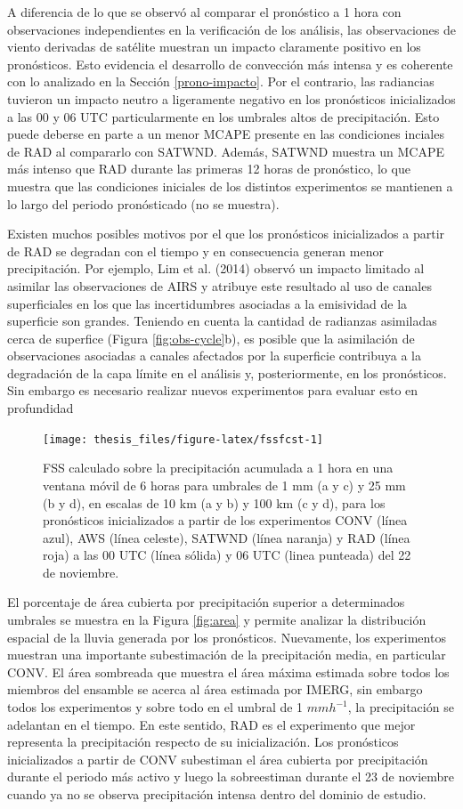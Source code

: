 \documentclass[12pt,oneside,a4paper]{reedthesis}
\begin{document}
A diferencia de lo que se observó al comparar el pronóstico a 1 hora con observaciones independientes en la verificación de los análisis, las observaciones de viento derivadas de satélite muestran un impacto claramente positivo en los pronósticos. Esto evidencia el desarrollo de convección más intensa y es coherente con lo analizado en la Sección \ref{prono-impacto}. Por el contrario, las radiancias tuvieron un impacto neutro a ligeramente negativo en los pronósticos inicializados a las 00 y 06 UTC particularmente en los umbrales altos de precipitación. Esto puede deberse en parte a un menor MCAPE presente en las condiciones inciales de RAD al compararlo con SATWND. Además, SATWND muestra un MCAPE más intenso que RAD durante las primeras 12 horas de pronóstico, lo que muestra que las condiciones iniciales de los distintos experimentos se mantienen a lo largo del periodo pronósticado (no se muestra).

Existen muchos posibles motivos por el que los pronósticos inicializados a partir de RAD se degradan con el tiempo y en consecuencia generan menor precipitación. Por ejemplo, Lim et al. (2014) observó un impacto limitado al asimilar las observaciones de AIRS y atribuye este resultado al uso de canales superficiales en los que las incertidumbres asociadas a la emisividad de la superficie son grandes. Teniendo en cuenta la cantidad de radianzas asimiladas cerca de superfice (Figura \ref{fig:obs-cycle}b), es posible que la asimilación de observaciones asociadas a canales afectados por la superficie contribuya a la degradación de la capa límite en el análisis y, posteriormente, en los pronósticos. Sin embargo es necesario realizar nuevos experimentos para evaluar esto en profundidad


\begin{figure}
\texttt{[image: thesis\_files/figure-latex/fssfcst-1]} \caption{FSS calculado sobre la precipitación acumulada a 1 hora en una ventana móvil de 6 horas para umbrales de 1 mm (a y c) y 25 mm (b y d), en escalas de 10 km (a y b) y 100 km (c y d), para los pronósticos inicializados a partir de los experimentos CONV (línea azul), AWS (línea celeste), SATWND (línea naranja) y RAD (línea roja) a las 00 UTC (línea sólida) y 06 UTC (linea punteada) del 22 de noviembre.}\label{fig:fssfcst}
\end{figure}
El porcentaje de área cubierta por precipitación superior a determinados umbrales se muestra en la Figura \ref{fig:area} y permite analizar la distribución espacial de la lluvia generada por los pronósticos. Nuevamente, los experimentos muestran una importante subestimación de la precipitación media, en particular CONV. El área sombreada que muestra el área máxima estimada sobre todos los miembros del ensamble se acerca al área estimada por IMERG, sin embargo todos los experimentos y sobre todo en el umbral de 1 \(mmh^{-1}\), la precipitación se adelantan en el tiempo. En este sentido, RAD es el experimento que mejor representa la precipitación respecto de su inicialización. Los pronósticos inicializados a partir de CONV subestiman el área cubierta por precipitación durante el periodo más activo y luego la sobreestiman durante el 23 de noviembre cuando ya no se observa precipitación intensa dentro del dominio de estudio.
\end{document}
